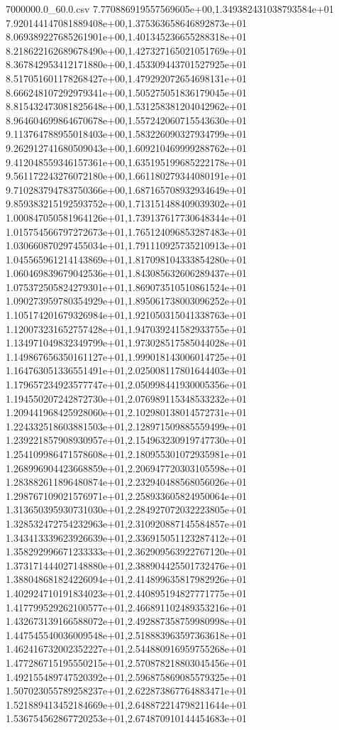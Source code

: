 \begin{filecontents*}{7000000.0_60.0.csv}
7.770886919557569605e+00,1.349382431038793584e+01
7.920144147081889408e+00,1.375363658646892873e+01
8.069389227685261901e+00,1.401345236655288318e+01
8.218622162689678490e+00,1.427327165021051769e+01
8.367842953412171880e+00,1.453309443701527925e+01
8.517051601178268427e+00,1.479292072654698131e+01
8.666248107292979341e+00,1.505275051836179045e+01
8.815432473081825648e+00,1.531258381204042962e+01
8.964604699864670678e+00,1.557242060715543630e+01
9.113764788955018403e+00,1.583226090327934799e+01
9.262912741680509043e+00,1.609210469999288762e+01
9.412048559346157361e+00,1.635195199685222178e+01
9.561172243276072180e+00,1.661180279344080191e+01
9.710283794783750366e+00,1.687165708932934649e+01
9.859383215192593752e+00,1.713151488409039302e+01
1.000847050581964126e+01,1.739137617730648344e+01
1.015754566797272673e+01,1.765124096853287483e+01
1.030660870297455034e+01,1.791110925735210913e+01
1.045565961214143869e+01,1.817098104333854280e+01
1.060469839679042536e+01,1.843085632606289437e+01
1.075372505824279301e+01,1.869073510510861524e+01
1.090273959780354929e+01,1.895061738003096252e+01
1.105174201679326984e+01,1.921050315041338763e+01
1.120073231652757428e+01,1.947039241582933755e+01
1.134971049832349799e+01,1.973028517585044028e+01
1.149867656350161127e+01,1.999018143006014725e+01
1.164763051336551491e+01,2.025008117801644403e+01
1.179657234923577747e+01,2.050998441930005356e+01
1.194550207242872730e+01,2.076989115348533232e+01
1.209441968425928060e+01,2.102980138014572731e+01
1.224332518603881503e+01,2.128971509885559499e+01
1.239221857908930957e+01,2.154963230919747730e+01
1.254109986471578608e+01,2.180955301072935981e+01
1.268996904423668859e+01,2.206947720303105598e+01
1.283882611896480874e+01,2.232940488568056026e+01
1.298767109021576971e+01,2.258933605824950064e+01
1.313650395930731030e+01,2.284927072032223805e+01
1.328532472754232963e+01,2.310920887145584857e+01
1.343413339623926639e+01,2.336915051123287412e+01
1.358292996671233333e+01,2.362909563922767120e+01
1.373171444027148880e+01,2.388904425501732476e+01
1.388048681824226094e+01,2.414899635817982926e+01
1.402924710191834023e+01,2.440895194827771775e+01
1.417799529262100577e+01,2.466891102489353216e+01
1.432673139166588072e+01,2.492887358759980998e+01
1.447545540036009548e+01,2.518883963597363618e+01
1.462416732002352227e+01,2.544880916959755268e+01
1.477286715195550215e+01,2.570878218803045456e+01
1.492155489747520392e+01,2.596875869085579325e+01
1.507023055789258237e+01,2.622873867764883471e+01
1.521889413452184669e+01,2.648872214798211644e+01
1.536754562867720253e+01,2.674870910144454683e+01

\end{filecontents*}
